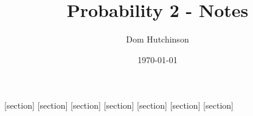\documentclass[11pt,a4paper]{article}
\begin{document}
\pagestyle{fancy}
\setlength\parindent{0pt}
\allowdisplaybreaks

\renewcommand{\headrulewidth}{0pt}

\title{Probability 2 - Notes}
\author{Dom Hutchinson}
\date{\today}
\maketitle

\fancyhead[R]{\today}


[section]
[section]
[section]
[section]
[section]
[section]
[section]

\newcommand{\dotprod}[0]{\boldsymbol{\cdot}}
\newcommand{\cosech}[0]{\mathrm{cosech}\ }
\newcommand{\cosec}[0]{\mathrm{cosec}\ }
\newcommand{\sech}[0]{\mathrm{sech}\ }
\newcommand{\expect}[0]{\mathbb{E}}
\newcommand{\nats}[0]{\mathbb{N}}
\newcommand{\prob}[0]{\mathbb{P}}
\newcommand{\real}[0]{\mathbb{R}}
\newcommand{\sigmafield}[0]{\mathcal{F}}
\newcommand{\nb}[0]{\textit{N.B. }}

\newcommand{\definition}[1]{\stepcounter{definition} \textbf{Definition \arabic{section}.\arabic{definition}\ - }\textit{#1}\\}
\newcommand{\example}[1]{\stepcounter{example} \textbf{Example \arabic{section}.\arabic{example}\ - }\textit{#1}\\}
\newcommand{\notation}[1]{\stepcounter{notation} \textbf{Notation \arabic{section}.\arabic{notation}\ - }\textit{#1}\\}
\newcommand{\proof}[1]{\stepcounter{proof} \textbf{Proof \arabic{section}.\arabic{proof}\ - }\textit{#1}\\}
\newcommand{\Proof}[1]{\stepcounter{proof} \textbf{Proof \arabic{section}.\arabic{proof}\ - }\textit{#1}}
\newcommand{\proposition}[1]{\stepcounter{proposition} \textbf{Proposition \arabic{section}.\arabic{proposition}\ - }\textit{#1}\\}
\newcommand{\remark}[1]{\stepcounter{remark} \textbf{Remark \arabic{section}.\arabic{remark}\ - }\textit{#1}\\}
\newcommand{\theorem}[1]{\stepcounter{theorem} \textbf{Theorem \arabic{section}.\arabic{theorem}\ - }\textit{#1}\\}
\end{document}
